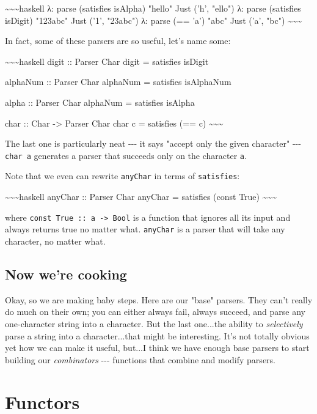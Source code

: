 \documentclass[]{article}
\begin{document}
\textasciitilde{}\textasciitilde{}\textasciitilde{}haskell λ: parse (satisfies
isAlpha) "hello" Just ('h', "ello") λ: parse (satisfies isDigit) "123abc" Just
('1', "23abc") λ: parse (== 'a') "abc" Just ('a', "bc")
\textasciitilde{}\textasciitilde{}\textasciitilde{}

In fact, some of these parsers are so useful, let's name some:

\textasciitilde{}\textasciitilde{}\textasciitilde{}haskell digit :: Parser Char
digit = satisfies isDigit

alphaNum :: Parser Char alphaNum = satisfies isAlphaNum

alpha :: Parser Char alphaNum = satisfies isAlpha

char :: Char -\textgreater{} Parser Char char c = satisfies (== c)
\textasciitilde{}\textasciitilde{}\textasciitilde{}

The last one is particularly neat -\/-\/- it says "accept only the given
character" -\/-\/- \texttt{char\ \textquotesingle{}a\textquotesingle{}}
generates a parser that succeeds only on the character \texttt{a}.

Note that we even can rewrite \texttt{anyChar} in terms of \texttt{satisfies}:

\textasciitilde{}\textasciitilde{}\textasciitilde{}haskell anyChar :: Parser
Char anyChar = satisfies (const True)
\textasciitilde{}\textasciitilde{}\textasciitilde{}

where \texttt{const\ True\ ::\ a\ -\textgreater{}\ Bool} is a function that
ignores all its input and always returns true no matter what. \texttt{anyChar}
is a parser that will take any character, no matter what.

\subsection{Now we're cooking}

Okay, so we are making baby steps. Here are our "base" parsers. They can't
really do much on their own; you can either always fail, always succeed, and
parse any one-character string into a character. But the last one...the ability
to \emph{selectively} parse a string into a character...that might be
interesting. It's not totally obvious yet how we can make it useful, but...I
think we have enough base parsers to start building our \emph{combinators}
-\/-\/- functions that combine and modify parsers.

\section{Functors}
\end{document}
